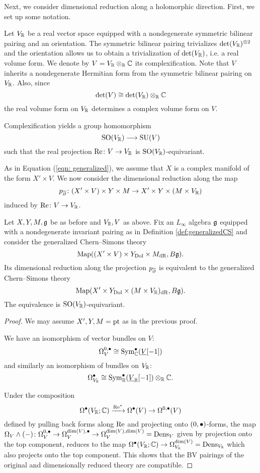 \documentclass[10pt, oneside]{article}
\begin{document}
Next, we consider dimensional reduction along a holomorphic direction. 
First, we set up some notation.

Let $V_\mathbb R$ be a real vector space equipped with a nondegenerate symmetric bilinear pairing and an orientation. 
The symmetric bilinear pairing trivializes $\det(V_\mathbb R)^{\otimes 2}$ and the orientation allows us to obtain a trivialization of $\det(V_\mathbb R)$, i.e. a real volume form. 
We denote by $V=V_\mathbb R\otimes_{\mathbb R}\mathbb C$ its complexification. 
Note that $V$ inherits a nondegenerate Hermitian form from the symmetric bilinear pairing on $V_\mathbb R$. 
Also, since
\[\det(V)\cong \det(V_\mathbb R)\otimes_{\mathbb R}\mathbb C\]
the real volume form on $V_\mathbb R$ determines a complex volume form on $V$. 

Complexification yields a group homomorphism
\begin{equation}
\mathrm{SO}(V_\mathbb R)\longrightarrow \mathrm{SU}(V)
\label{eq:SOtoSU}
\end{equation}
such that the real projection $\mathrm{Re}\colon V\rightarrow V_\mathbb R$ is $\mathrm{SO}(V_\mathbb R)$-equivariant.

As in Equation (\ref{eqn: generalized}), we assume that $X$ is a complex manifold of the form $X' \times V$.  We now consider the dimensional reduction along the map
\[
p_{\overline{\partial}}\colon (X' \times V) \times Y \times M \to X' \times Y \times (M \times V_\mathbb R)
\]
induced by ${\rm Re}\colon V \to V_{\mathbb R}$.



\begin{prop} \label{CS_diml_red_prop}
Let $X,Y,M,\mathfrak g$ be as before and $V_\mathbb R, V$ as above. Fix an $L_\infty$ algebra $\mathfrak g$ equipped with a nondegenerate invariant pairing as in Definition \ref{def:generalizedCS} and consider the generalized Chern--Simons theory
\[\operatorname{Map}((X'\times V)\times Y_{\mathrm{Dol}}\times M_{\mathrm{dR}}, B\mathfrak g).\]
Its dimensional reduction along the projection $p_{\overline{\partial}}$ is equivalent to the generalized Chern--Simons theory
\[\operatorname{Map}(X'\times Y_{\mathrm{Dol}}\times (M\times V_\mathbb R)_{\mathrm{dR}}, B\mathfrak g).\]
The equivalence is $\mathrm{SO}(V_\mathbb R)$-equivariant.
\end{prop}
\begin{proof}
We may assume $X',Y,M=\operatorname{pt}$ as in the previous proof.

We have an isomorphism of vector bundles on $V$:
\[\Omega^{0, \bullet}_V\cong {\rm Sym}_\mathbb C^\bullet(\underline{V}[-1])\]
and similarly an isomorphism of bundles on $V_\mathbb R$:
\[\Omega^\bullet_{V_\mathbb R}\cong {\rm Sym}_\mathbb R^\bullet(\underline{V}_\mathbb R[-1])\otimes_\mathbb R\mathbb C.\]

Under the composition
\[\Omega^\bullet(V_\mathbb R; \mathbb C)\xrightarrow{\mathrm{Re}^*} \Omega^\bullet(V)\rightarrow \Omega^{0, \bullet}(V)\]
defined by pulling back forms along $\mathrm{Re}$ and projecting onto $(0,\bullet)$-forms, the map $\Omega_V\wedge (-)\colon \Omega^{0, \bullet}_V \to \Omega^{{\rm dim}(V),\bullet}_V \to \Omega^{\dim(V),\dim(V)}_V = {\rm Dens}_V$ given by projection onto the top component, reduces to the map $\Omega^{\bullet}(V_\mathbb R;\mathbb C)\rightarrow \Omega^{\dim(V)}_{V_\mathbb R} = {\rm Dens}_{V_\mathbb R}$ which also projects onto the top component. 
This shows that the BV pairings of the original and dimensionally reduced theory are compatible. 
\end{proof}
\end{document}
